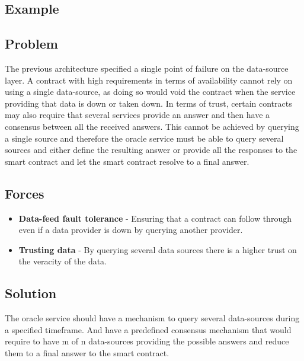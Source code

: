 \subsection{Example}

\subsection{Problem}
The previous architecture specified a single point of failure on the data-source layer. A contract with high requirements in terms of availability cannot rely on using a single data-source, as doing so would void the contract when the service providing that data is down or taken down. In terms of trust, certain contracts may also require that several services provide an answer and then have a consensus between all the received answers. This cannot be achieved by querying a single source and therefore the oracle service must be able to query several sources and either define the resulting answer or provide all the responses to the smart contract and let the smart contract resolve to a final answer.

\subsection{Forces}
\begin{itemize}
  \item \textbf{Data-feed fault tolerance} - Ensuring that a contract can follow through even if a data provider is down by querying another provider.
  \item \textbf{Trusting data} - By querying several data sources there is a higher trust on the veracity of the data.
\end{itemize}

\subsection{Solution}
The oracle service should have a mechanism to query several data-sources during a specified timeframe. And have a predefined consensus mechanism that would require to have m of n data-sources providing the possible answers and reduce them to a final answer to the smart contract.


